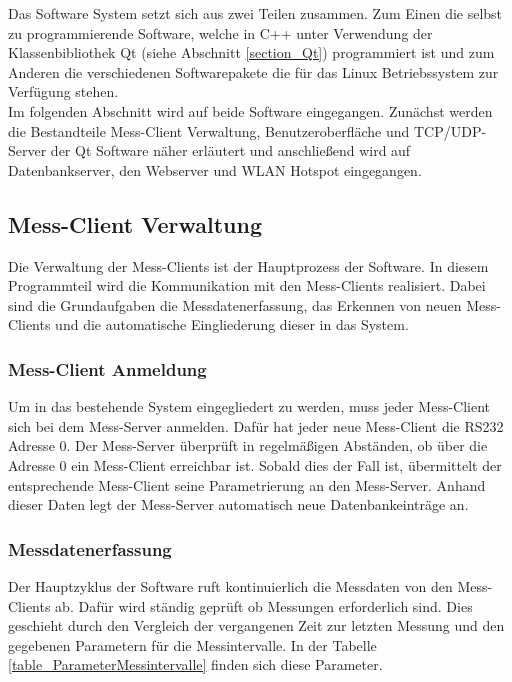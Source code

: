 Das Software System setzt sich aus zwei Teilen zusammen. Zum Einen die selbst zu programmierende Software, welche in C++ unter Verwendung der Klassenbibliothek Qt (siehe Abschnitt \ref{section_Qt}) programmiert ist und zum Anderen die verschiedenen Softwarepakete die für das Linux Betriebssystem zur Verfügung stehen.\\
Im folgenden Abschnitt wird auf beide Software eingegangen. Zunächst werden die Bestandteile Mess-Client Verwaltung, Benutzeroberfläche und TCP/UDP-Server der Qt Software näher erläutert und anschließend wird auf Datenbankserver, den Webserver und WLAN Hotspot eingegangen.


\subsection{Mess-Client Verwaltung}
Die Verwaltung der Mess-Clients ist der Hauptprozess der Software. In diesem Programmteil wird die Kommunikation mit den Mess-Clients realisiert. Dabei sind die Grundaufgaben die Messdatenerfassung, das Erkennen von neuen Mess-Clients und die automatische Eingliederung dieser in das System.

\subsubsection{Mess-Client Anmeldung}
Um in das bestehende System eingegliedert zu werden, muss jeder Mess-Client sich bei dem Mess-Server anmelden. Dafür hat jeder neue Mess-Client die RS232 Adresse 0. Der Mess-Server überprüft in regelmäßigen Abständen, ob über die Adresse 0 ein Mess-Client erreichbar ist. Sobald dies der Fall ist, übermittelt der entsprechende Mess-Client seine Parametrierung an den Mess-Server. Anhand dieser Daten legt der Mess-Server automatisch neue Datenbankeinträge an.

\subsubsection{Messdatenerfassung}

Der Hauptzyklus der Software ruft kontinuierlich die Messdaten von den Mess-Clients ab. Dafür wird ständig geprüft ob Messungen erforderlich sind. Dies geschieht durch den Vergleich der vergangenen Zeit zur letzten Messung und den gegebenen Parametern für die Messintervalle. In der Tabelle \ref{table_ParameterMessintervalle} finden sich diese Parameter.\\


